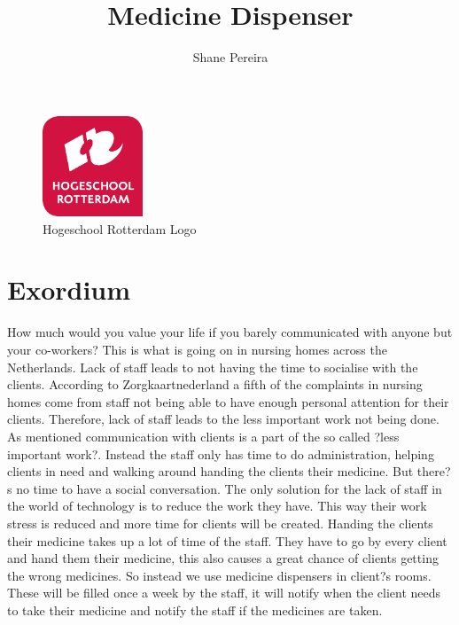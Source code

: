 \documentclass{article}
\author{Shane Pereira}
\title{Medicine Dispenser}
\begin{document}
	\thispagestyle{empty}
	\maketitle
	\begin{figure}
		\centering
		\includegraphics[width = 30mm]{Hogoschool-Rotterdam-Logo.pdf}
		\caption{Hogeschool Rotterdam Logo}
		\label{fig:HRO Logo}
	\end{figure}
	
	\newpage
	\tableofcontents
	\newpage
	

\section{Exordium}
How much would you value your life if you barely communicated with anyone but your co-workers? This is what is going on in nursing homes across the Netherlands. Lack of staff leads to not having the time to socialise with the clients\cite{salas:calculus}. According to Zorgkaartnederland a fifth of the complaints in nursing homes come from staff not being able to have enough personal attention for their clients. 
Therefore, lack of staff leads to the less important work not being done. As mentioned communication with clients is a part of the so called ?less important work?. Instead the staff only has time to do administration, helping clients in need and walking around handing the clients their medicine. But there?s no time to have a social conversation.
The only solution for the lack of staff in the world of technology is to reduce the work they have. This way their work stress is reduced and more time for clients will be created. Handing the clients their medicine takes up a lot of time of the staff. They have to go by every client and hand them their medicine, this also causes a great chance of clients getting the wrong medicines. So instead we use medicine dispensers in client?s rooms\cite{bowman:reasoning}. These will be filled once a week by the staff, it will notify when the client needs to take their medicine and notify the staff if the medicines are taken.
\end{document}
